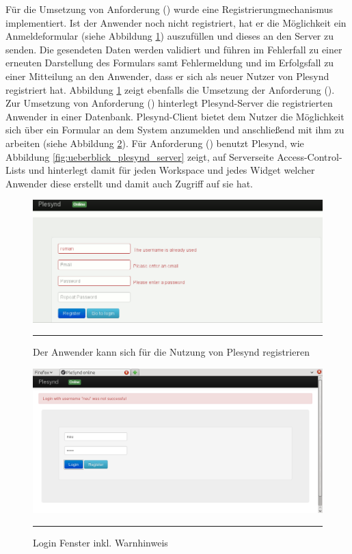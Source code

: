 Für die Umsetzung von Anforderung  (\emph{\requirementRegistrieren}) wurde eine Registrierungmechanismus implementiert. Ist der Anwender noch nicht registriert, hat er die Möglichkeit ein Anmeldeformular (siehe Abbildung \ref{fig:plesynd_register}) auszufüllen und dieses an den Server zu senden. Die gesendeten Daten werden validiert und führen im Fehlerfall zu einer erneuten Darstellung des Formulars samt Fehlermeldung und im Erfolgsfall zu einer Mitteilung an den Anwender, dass er sich als neuer Nutzer von Plesynd registriert hat. Abbildung \ref{fig:plesynd_register} zeigt ebenfalls die Umsetzung der Anforderung  (\emph{\requirementUniqueLoginEmail}).
Zur Umsetzung von Anforderung  (\emph{\requirementLogin}) hinterlegt Plesynd-Server die registrierten Anwender in einer Datenbank. Plesynd-Client bietet dem Nutzer die Möglichkeit sich über ein Formular an dem System anzumelden und anschließend mit ihm zu arbeiten (siehe Abbildung \ref{fig:plesynd_login}). Für Anforderung  (\emph{\requirementZugriffAufEigeneWidgets}) benutzt Plesynd, wie Abbildung \ref{fig:ueberblick_plesynd_server} zeigt, auf Serverseite Access-Control-Lists und hinterlegt damit für jeden Workspace und jedes Widget welcher Anwender diese erstellt und damit auch Zugriff auf sie hat.  
\begin{figure}[H]
  \centering
  \includegraphics[width=\textwidth]{./Figures/plesynd_register.png}
    \rule{35em}{0.5pt}
  \caption[Plesynd User"=Interface: Registrieren]{Der Anwender kann sich für die Nutzung von Plesynd registrieren}
  \label{fig:plesynd_register}
\end{figure}
\begin{figure}[H]
  \centering
  \includegraphics[width=\textwidth]{./Figures/plesynd_login.png}
    \rule{35em}{0.5pt}
  \caption[Plesynd User"=Interface: Login]{Login Fenster inkl. Warnhinweis}
  \label{fig:plesynd_login}
\end{figure}
